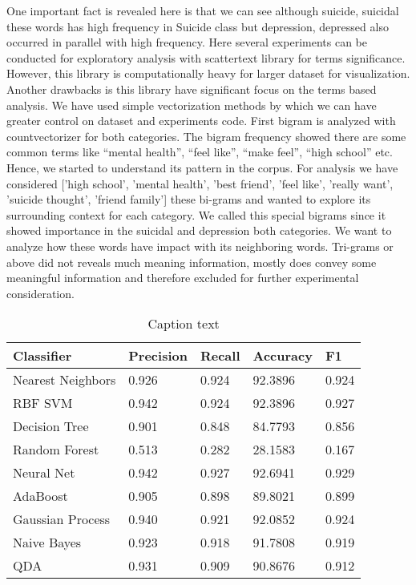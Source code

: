 \documentclass[12pt, letterpaper]{article}
\begin{document}
One important fact is revealed here is that we can see although suicide, suicidal these words has high frequency in Suicide class but depression, depressed also occurred in parallel with high frequency. Here several experiments can be conducted for exploratory analysis with scattertext library for terms significance. However, this library is computationally heavy for larger dataset for visualization. Another drawbacks is this library have significant focus on the terms based analysis. We have used simple vectorization methods by which we can have greater control on dataset and experiments code. First bigram is analyzed with countvectorizer for both categories. The bigram frequency showed there are some common terms like “mental health”, “feel like”, “make feel”, “high school” etc. Hence, we started to understand its pattern in the corpus. For analysis we have considered ['high school', 'mental health', 'best friend', 'feel like', 'really want', 'suicide thought', 'friend family'] these bi-grams and wanted to explore its surrounding context for each category. We called this special bigrams since it showed importance in the suicidal and depression both categories. We want to analyze how these words have impact with its neighboring words. Tri-grams or above did not reveals much meaning information, mostly does convey some meaningful information and therefore excluded for further experimental consideration. 
\begin{table}[h]
\begin{center}
\begin{minipage}{174pt}
\caption{Caption text}\label{tab1}%
\begin{tabular}{@{}lllll@{}}
\toprule
Classifier & Precision & Recall & Accuracy & F1 \\
\midrule
Nearest Neighbors & 0.926 & 0.924 & 92.3896 & 0.924\\
RBF SVM & 0.942 & 0.924 & 92.3896 & 0.927\\
Decision Tree & 0.901 & 0.848 & 84.7793 & 0.856\\
Random Forest & 0.513 & 0.282 & 28.1583 & 0.167\\
Neural Net & 0.942 & 0.927 & 92.6941 & 0.929\\
AdaBoost & 0.905 & 0.898 & 89.8021 & 0.899\\
Gaussian Process & 0.940 & 0.921 & 92.0852 & 0.924\\
Naive Bayes & 0.923 & 0.918 & 91.7808 & 0.919\\
QDA & 0.931 & 0.909 & 90.8676 & 0.912\\
\end{tabular}
\end{minipage}
\end{center}
\end{table}
\end{document}
